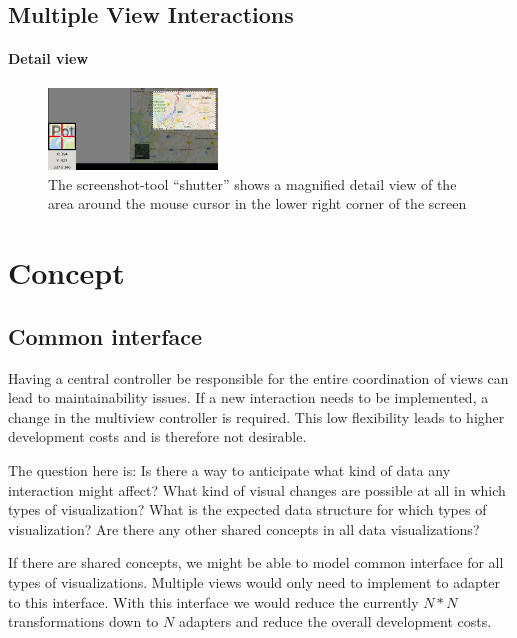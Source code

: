 \documentclass{article}
\begin{document}
\subsection{Multiple View Interactions}\label{sec:analysis:examples}

\paragraph{Detail view}
\begin{figure}
  \centering
  \includegraphics[width=0.4\textwidth]{images/chartTypes/multi/detail-view}
  \caption{The screenshot-tool ``shutter'' shows a magnified detail view of the area around the mouse cursor in the lower right corner of the screen}\label{fig:concept:chart-types:detail}
\end{figure}

\clearpage
\section{Concept}\label{sec:concept}

\subsection{Common interface}

Having a central controller be responsible for the entire coordination of views can lead to maintainability issues.
If a new interaction needs to be implemented, a change in the multiview controller is required.
This low flexibility leads to higher development costs and is therefore not desirable.

The question here is:
Is there a way to anticipate what kind of data any interaction might affect?
What kind of visual changes are possible at all in which types of visualization?
What is the expected data structure for which types of visualization?
Are there any other shared concepts in all data visualizations?

If there are shared concepts, we might be able to model common interface for all types of visualizations.
Multiple views would only need to implement to adapter to this interface.
With this interface we would reduce the currently $N*N$ transformations down to $N$ adapters and reduce the overall development costs.
\end{document}
